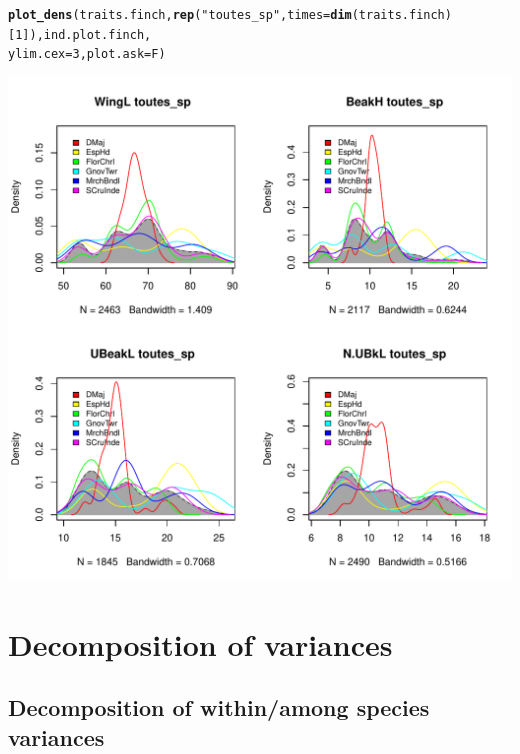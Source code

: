 \documentclass[12pt]{article}\usepackage[]{graphicx}\usepackage[]{color}
\makeatletter
\def\maxwidth{ %
  \ifdim\Gin@nat@width>\linewidth
    \linewidth
  \else
    \Gin@nat@width
  \fi
}
\newcommand{\hlnum}[1]{\textcolor[rgb]{0.686,0.059,0.569}{#1}}%
\newcommand{\hlstr}[1]{\textcolor[rgb]{0.192,0.494,0.8}{#1}}%
\newcommand{\hlstd}[1]{\textcolor[rgb]{0.345,0.345,0.345}{#1}}%
\newcommand{\hlkwc}[1]{\textcolor[rgb]{0.333,0.667,0.333}{#1}}%
\newcommand{\hlkwd}[1]{\textcolor[rgb]{0.737,0.353,0.396}{\textbf{#1}}}%
\newenvironment{kframe}{%
 \def\at@end@of@kframe{}%
 \ifinner\ifhmode%
  \def\at@end@of@kframe{\end{minipage}}%
  \begin{minipage}{\columnwidth}%
 \fi\fi%
 \def\FrameCommand##1{\hskip\@totalleftmargin \hskip-\fboxsep
 \colorbox{shadecolor}{##1}\hskip-\fboxsep
     \hskip-\linewidth \hskip-\@totalleftmargin \hskip\columnwidth}%
 \MakeFramed {\advance\hsize-\width
   \@totalleftmargin\z@ \linewidth\hsize
   \@setminipage}}%
 {\par\unskip\endMakeFramed%
 \at@end@of@kframe}
\newenvironment{knitrout}{}{} %
\makeatother
\begin{document}
\begin{knitrout}
\color{fgcolor}\begin{kframe}
\begin{alltt}
\hlkwd{plot_dens}\hlstd{(traits.finch,} \hlkwd{rep}\hlstd{(}\hlstr{"toutes_sp"}\hlstd{,} \hlkwc{times} \hlstd{=} \hlkwd{dim}\hlstd{(traits.finch)[}\hlnum{1}\hlstd{]), ind.plot.finch,}
    \hlkwc{ylim.cex} \hlstd{=} \hlnum{3}\hlstd{,} \hlkwc{plot.ask} \hlstd{= F)}
\end{alltt}
\end{kframe}
\includegraphics[width=\maxwidth]{figure/unnamed-chunk-7} 

\end{knitrout}




\newpage

\section{Decomposition of variances}

\subsection{Decomposition of within/among species variances}
\end{document}
